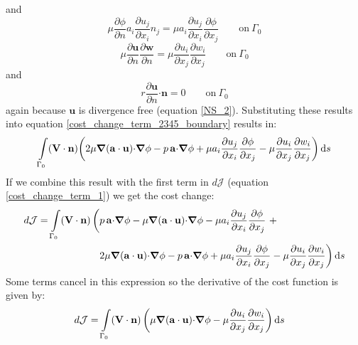 \documentclass[12pt, a4paper]{article}
\begin{document}
and
\begin{equation*}
\mu \frac{\partial \phi}{\partial n} a_i \frac{\partial u_j}{\partial x_i} n_j = 
\mu a_i \frac{\partial u_j}{\partial x_i} \frac{\partial \phi}{\partial x_j}
\qquad \text{on} \ \Gamma_0
\end{equation*}
\begin{equation*}
\mu \frac{\partial \mathbf{u}}{\partial n} \frac{\partial \mathbf{w}}{\partial n} = 
\mu \frac{\partial u_i}{\partial x_j} \frac{\partial w_i}{\partial x_j}
\qquad \text{on} \ \Gamma_0
\end{equation*}
and
\begin{equation*}
r \frac{\partial \mathbf{u}}{\partial n} \mathbf{\cdot n} = 
0
\qquad \text{on} \ \Gamma_0
\end{equation*}
again because $\mathbf{u}$ is divergence free (equation \ref{NS_2}). Substituting these results into equation \ref{cost_change_term_2345_boundary} results in:
\begin{equation}
\int\limits_{\Gamma_0} (\mathbf{V \cdot n}) \bigg{(}
2 \mu \boldsymbol{\nabla} (\mathbf{a \cdot u}) \mathbf{\cdot} \boldsymbol{\nabla} \phi - 
p \, \mathbf{a \cdot} \boldsymbol{\nabla} \phi + 
\mu a_i \frac{\partial u_j}{\partial x_i} \frac{\partial \phi}{\partial x_j} - 
\mu \frac{\partial u_i}{\partial x_j} \frac{\partial w_i}{\partial x_j}
\bigg{)} \, \mathrm{d}s
\end{equation}
If we combine this result with the first term in $d \mathcal{J}$ (equation \ref{cost_change_term_1}) we get the cost change:
\begin{equation}
\begin{split}
d \mathcal{J} = 
\int\limits_{\Gamma_0}(\mathbf{V \cdot n}) \, \bigg{(} &
p\, \mathbf{a \cdot} \boldsymbol{\nabla} \phi -
\mu \boldsymbol{\nabla}(\mathbf{a \cdot u}) \mathbf{\cdot} \boldsymbol{\nabla} \phi - 
\mu a_i \frac{\partial u_j}{\partial x_i} \frac{\partial \phi}{\partial x_j} \ + \\
&2 \mu \boldsymbol{\nabla} (\mathbf{a \cdot u}) \mathbf{\cdot} \boldsymbol{\nabla} \phi - 
p \, \mathbf{a \cdot} \boldsymbol{\nabla} \phi + 
\mu a_i \frac{\partial u_j}{\partial x_i} \frac{\partial \phi}{\partial x_j} - 
\mu \frac{\partial u_i}{\partial x_j} \frac{\partial w_i}{\partial x_j}
\bigg{)} \, \mathrm{d}s
\end{split}
\end{equation}
Some terms cancel in this expression so the derivative of the cost function is given by:
\begin{equation}
\begin{split}
d \mathcal{J} = \int\limits_{\Gamma_0}(\mathbf{V \cdot n}) \, \bigg{(} &
\mu \boldsymbol{\nabla}(\mathbf{a \cdot u}) \mathbf{\cdot} \boldsymbol{\nabla} \phi -
\mu \frac{\partial u_i}{\partial x_j} \frac{\partial w_i}{\partial x_j}
\bigg{)} \, \mathrm{d}s
\end{split}
\end{equation}
\end{document}
